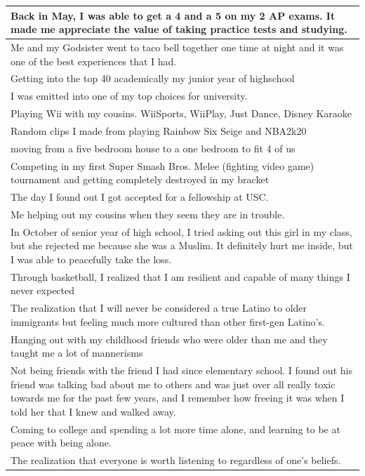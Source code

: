 \documentclass[
  .7em,
  letterpaper,
  DIV=11,
  numbers=noendperiod]{scrartcl}
\begin{document}
\begin{table}
\begin{tabular}{l}
\hline
Back in May, I was able to get a 4 and a 5 on my 2 AP exams. It made me appreciate the value of taking practice tests and studying.\\
\hline
Me and my Godsister went to taco bell together one time at night and it was one of the best experiences that I had.\\
\hline
Getting into the top 40 academically my junior year of highschool\\
\hline
I was emitted into one of my top choices for university.\\
\hline
Playing Wii with my cousins. WiiSports, WiiPlay, Just Dance, Disney Karaoke\\
\hline
Random clips I made from playing Rainbow Six Seige and NBA2k20\\
\hline
moving from a five bedroom house to a one bedroom to fit 4 of us\\
\hline
Competing in my first Super Smash Bros. Melee (fighting video game) tournament and getting completely destroyed in my bracket\\
\hline
The day I found out I got accepted for a fellowship at USC.\\
\hline
Me helping out my cousins when they seem they are in trouble.\\
\hline
In October of senior year of high school, I tried asking out this girl in my class, but she rejected me because she was a Muslim. It definitely hurt me inside, but I was able to peacefully take the loss.\\
\hline
Through basketball, I realized that I am resilient and capable of many things I never expected\\
\hline
The realization that I will never be considered a true Latino to older immigrants but feeling much more cultured than other first-gen Latino's.\\
\hline
Hanging out with my childhood friends who were older than me and they taught me a lot of mannerisms\\
\hline
Not being friends with the friend I had since elementary school. I found out his friend was talking bad about me to others and was just over all really toxic towards me for the past few years, and I remember how freeing it was when I told her that I knew and walked away.\\
\hline
Coming to college and spending a lot more time alone, and learning to be at peace with being alone.\\
\hline
The realization that everyone is worth listening to regardless of one's beliefs.\\

\end{tabular}
\end{table}
\end{document}
